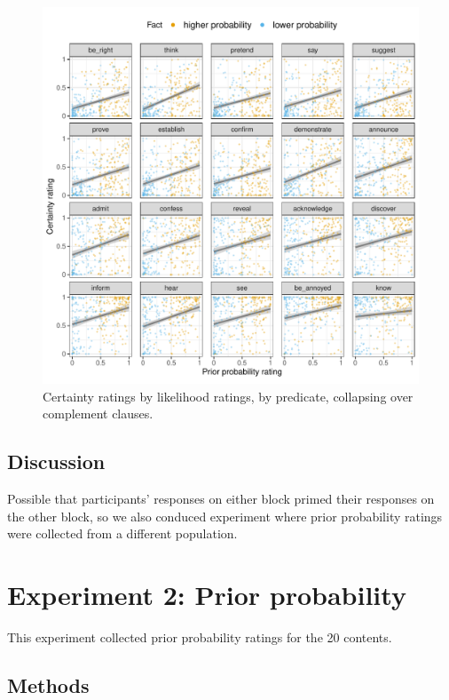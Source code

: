 \documentclass[11pt,fleqn]{article}
\newcommand{\6}{\mbox{$[\hspace*{-.6mm}[$}}
\newcommand{\9}{\mbox{$]\hspace*{-.6mm}]$}}
\begin{document}
\begin{figure}[H]
\centering

\includegraphics[width=.9\paperwidth]{../../results/exp4/graphs/projection-by-prior}

\caption{Certainty ratings by likelihood ratings, by predicate, collapsing over complement clauses.}
\label{f-projection}
\end{figure}

\subsection{Discussion}

Possible that participants' responses on either block primed their responses on the other block, so we also conduced experiment where prior probability ratings were collected from a different population.

\section{Experiment 2: Prior probability}

This experiment collected prior probability ratings for the 20 contents.

\subsection{Methods}
\end{document}
